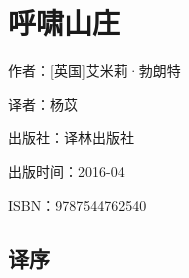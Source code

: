 








\section{呼啸山庄}


\par 作者：[英国]艾米莉·勃朗特
\par 译者：杨苡
\par 出版社：译林出版社
\par 出版时间：2016-04
\par ISBN：9787544762540



\subsection{译序}

